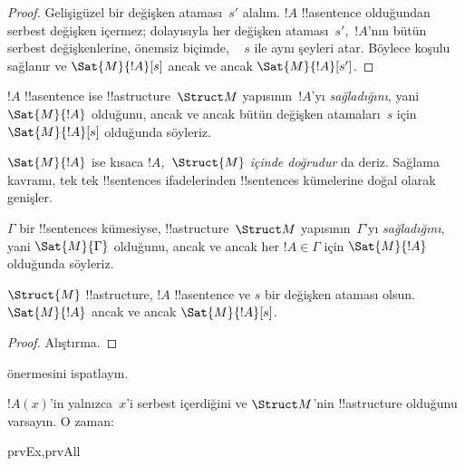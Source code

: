 \documentclass[../../../include/open-logic-section]{subfiles}
\begin{document}
\begin{proof}
  Gelişigüzel bir değişken ataması~$s'$ alalım. $!A$ !!a{sentence}
  olduğundan serbest değişken içermez; dolayısıyla her değişken
  ataması~$s'$,~$!A$'nın bütün serbest değişkenlerine, önemsiz biçimde,
  ~ $s$ ile aynı şeyleri atar. Böylece  koşulu
  sağlanır ve $\Sat{M}{!A}[s]$ ancak ve ancak $\Sat{M}{!A}[s']$.
\end{proof}

\begin{defn}
$!A$ !!a{sentence} ise !!a{structure}~$\Struct M$ yapısının~$!A$'yı
\emph{sağladığını}, yani $\Sat{M}{!A}$ olduğunu, ancak ve ancak bütün
değişken atamaları~$s$ için $\Sat{M}{!A}[s]$ olduğunda söyleriz.
\end{defn}

$\Sat{M}{!A}$ ise kısaca \emph{$!A$,~$\Struct{M}$ içinde doğrudur} da
deriz. Sağlama kavramı, tek tek !!{sentence}s ifadelerinden
!!{sentence}s kümelerine doğal olarak genişler.

\begin{defn}
$\Gamma$ bir !!{sentence}s kümesiyse, !!a{structure}~$\Struct M$
yapısının~$\Gamma$'yı \emph{sağladığını}, yani $\Sat{M}{\Gamma}$
olduğunu, ancak ve ancak her $!A \in \Gamma$ için $\Sat{M}{!A}$
olduğunda söyleriz.
\end{defn}

\begin{prop}
  $\Struct{M}$ !!a{structure}, $!A$ !!a{sentence} ve $s$ bir değişken
  ataması olsun. $\Sat{M}{!A}$ ancak ve ancak $\Sat{M}{!A}[s]$.
\end{prop}

\begin{proof}
Alıştırma.
\end{proof}

\begin{prob}
 önermesini ispatlayın.
\end{prob}

\begin{prop}
  $!A(x)$'in yalnızca~$x$'i serbest içerdiğini ve $\Struct M$'nin
  !!a{structure} olduğunu varsayın. O zaman:
  \begin{tagenumerate}{prvEx,prvAll}
\end{tagenumerate}
\end{prop}
\end{document}
